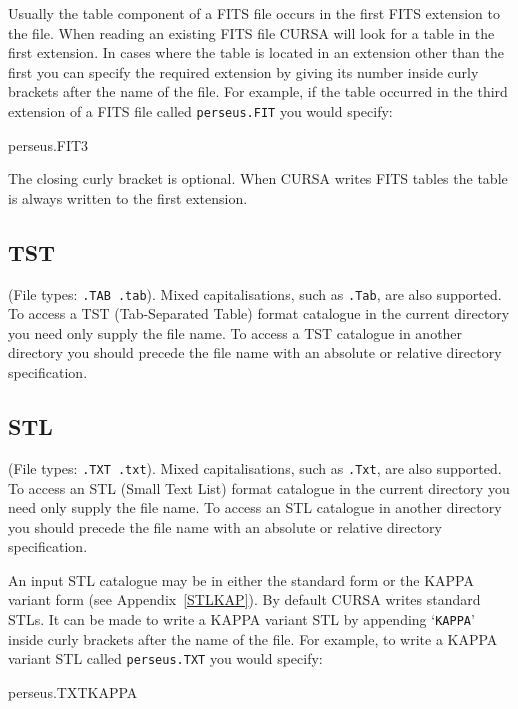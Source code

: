 \documentclass[twoside,11pt]{starlink}
\begin{document}
Usually the table component of a FITS file occurs in the first FITS
extension to the file. When reading an existing FITS file CURSA will look
for a table in the first extension. In cases where the table is located
in an extension other than the first you can specify the required
extension by giving its number inside curly brackets after the name
of the file. For example, if the table occurred in the third extension
of a FITS file called \texttt{perseus.FIT} you would specify:

\begin{terminalv}
perseus.FIT{3}
\end{terminalv}

The closing curly bracket is optional. When CURSA writes FITS tables
the table is always written to the first extension.

\subsection{TST}

(File types: \texttt{.TAB .tab}). Mixed capitalisations, such as \texttt{.Tab}, are also supported.  To access a TST (Tab-Separated Table) format
catalogue in the current directory you need only supply the file name.
To access a TST catalogue in another directory you should precede the
file name with an absolute or relative directory specification.

\subsection{STL}

(File types: \texttt{.TXT .txt}). Mixed capitalisations, such as \texttt{.Txt}, are also supported.  To access an STL (Small Text List) format
catalogue in the current directory you need only supply the file name.
To access an STL catalogue in another directory you should precede the
file name with an absolute or relative directory specification.

An input STL catalogue may be in either the standard form or the KAPPA
variant form (see Appendix~\ref{STLKAP}).  By default CURSA writes standard
STLs.  It can be made to write a KAPPA variant STL by appending `\texttt{KAPPA}' inside curly brackets after the name of the file.  For example,
to write a KAPPA variant STL called \texttt{perseus.TXT} you would specify:

\begin{terminalv}
perseus.TXT{KAPPA}
\end{terminalv}
\end{document}
